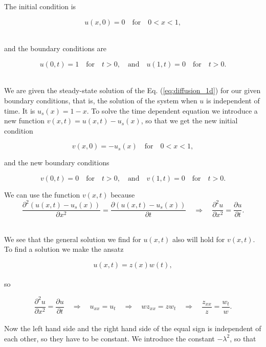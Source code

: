 \documentclass[12pt]{article}
\begin{document}
\begin{flushleft}
The initial condition is 

\vspace{5mm}
$$u(x,0) = 0\quad\text{for}\quad 0<x<1,$$\\
\vspace{5mm}

and the boundary conditions are 

\vspace{5mm}
$$u(0,t) = 1\quad\text{for}\quad t>0,\quad\text{and}\quad u(1,t) = 0\quad\text{for}\quad t>0.$$\\
\vspace{5mm}

We are given the steady-state solution of the Eq. (\ref{eq:diffusion_1d}) for our given boundary conditions, that is, the solution of the system when $u$ is independent of time. It is $u_s(x) = 1-x$. To solve the time dependent equation we introduce a new function $v(x,t) = u(x,t) - u_s(x)$, so that we get the new initial condition 

\vspace{5mm}
\begin{equation}\label{eq:initial_cond_v}
v(x,0) = -u_s(x)\quad\text{for}\quad 0<x<1,
\end{equation}
\vspace{5mm}

and the new boundary conditions 

\vspace{5mm}
\begin{equation}\label{eq:boundary_cond_v}
v(0,t) = 0\quad\text{for}\quad t>0,\quad\text{and}\quad v(1,t) = 0\quad\text{for}\quad t>0.
\end{equation}
\vspace{5mm}

We can use the function $v(x,t)$ because 
\vspace{5mm}
$$\frac{\partial^2 (u(x,t) - u_s(x))}{\partial x^2} = \frac{\partial (u(x,t) - u_s(x))}{\partial t}\quad\Rightarrow\quad \frac{\partial^2 u}{\partial x^2} = \frac{\partial u}{\partial t}.$$\\
\vspace{5mm}

We see that the general solution we find for $u(x,t)$ also will hold for $v(x,t)$. To find a solution we make the ansatz

\vspace{5mm}
$$u(x,t) = z(x)w(t),$$\\

so

$$\frac{\partial^2 u}{\partial x^2} = \frac{\partial u}{\partial t} \quad\Rightarrow\quad u_{xx} = u_t \quad\Rightarrow\quad wz_{xx} = zw_t \quad\Rightarrow\quad \frac{z_{xx}}{z} = \frac{w_t}{w}.$$\\
\vspace{5mm}
Now the left hand side and the right hand side of the equal sign is independent of each other, so they have to be constant. We introduce the constant $-\lambda^2$, so that


\end{flushleft}
\end{document}
